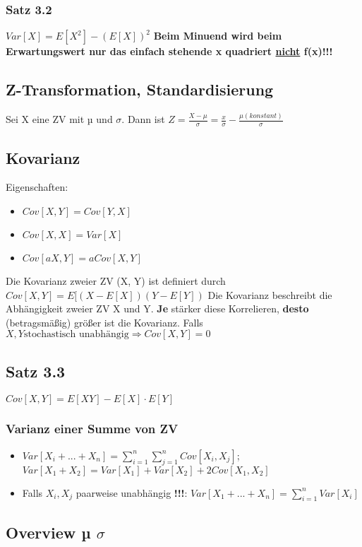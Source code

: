\subsubsection{Satz 3.2}
$Var[X] = E[X^2] - (E[X])^2$ \textbf{Beim Minuend wird beim Erwartungswert nur das einfach stehende x quadriert \underline{nicht} f(x)!!!}
\subsection{Z-Transformation, Standardisierung}
Sei X eine ZV mit µ und $\sigma$. Dann ist $Z = \frac{X - \mu}{\sigma} = \frac{x}{\sigma} - \frac{\mu (konstant)}{\sigma}$ 
\subsection{Kovarianz}
Eigenschaften:
\begin{itemize}
	\item $Cov[X, Y] = Cov[Y,X]$
	\item $Cov[X, X] = Var[X]$
	\item $Cov[aX, Y] = a Cov[X,Y]$
\end{itemize}
Die Kovarianz zweier ZV (X, Y) ist definiert durch
$Cov[X, Y] = E[(X - E[X])(Y-E[Y])$
Die Kovarianz beschreibt die Abhängigkeit zweier ZV X und Y. \textbf{Je} stärker diese Korrelieren, \textbf{desto} (betragsmäßig) größer ist die Kovarianz. Falls $X, Y \text{stochastisch unabhängig} \Rightarrow Cov[X, Y] = 0$ 
\subsection{Satz 3.3}
$Cov[X, Y] = E[XY] - E[X] \cdot E[Y]$\\
\subsubsection{Varianz einer Summe von ZV}
\begin{itemize}
	\item $Var[X_{i} + ... + X_{n}] = \sum_{i=1}^{n} \sum_{j=1}^{n} Cov[X_{i}, X_{j}]$;
	$Var[X_{1} + X_{2}] = Var[X_{1}] + Var[X_{2}] + 2Cov[X_{1}, X_{2}]$
	\item Falls $X_{i} , X_{j}$ paarweise unabhängig \textbf{!!!}: $Var[X_{1} + ...+ X_{n}] = \sum_{i=1}^{n} Var[X_{i}]$
\end{itemize}
\subsection{Overview µ $\sigma$}
